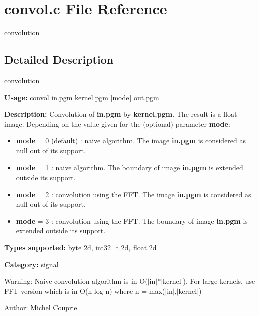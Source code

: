 \section{convol.c File Reference}
\label{convol_8c}
convolution  




\label{_details}
\subsection{Detailed Description}
convolution 

{\bf Usage:} convol in.pgm kernel.pgm [mode] out.pgm

{\bf Description:} Convolution of {\bf in.pgm} by {\bf kernel.pgm}. The result is a float image. Depending on the value given for the (optional) parameter {\bf mode}: \begin{itemize}
\item {\bf mode} = 0 (default) : naive algorithm. The image {\bf in.pgm} is considered as null out of its support. \item {\bf mode} = 1 : naive algorithm. The boundary of image {\bf in.pgm} is extended outside its support. \item {\bf mode} = 2 : convolution using the FFT. The image {\bf in.pgm} is considered as null out of its support. \item {\bf mode} = 3 : convolution using the FFT. The boundary of image {\bf in.pgm} is extended outside its support.\end{itemize}
{\bf Types supported:} byte 2d, int32\_\-t 2d, float 2d

{\bf Category:} signal

\begin{Desc}
\item[Warning:]Naive convolution algorithm is in O($|$in$|$$\ast$$|$kernel$|$). For large kernels, use FFT version which is in O(n log n) where n = max($|$in$|$,$|$kernel$|$)\end{Desc}
\begin{Desc}
\item[Author:]Michel Couprie \end{Desc}
